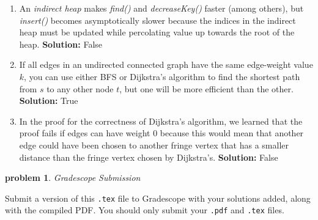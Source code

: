 \documentclass[10pt]{article}
\newcommand{\solution}[1]{\color{blue}\hfill\break\noindent\textbf{Solution:} #1\color{black}}
\newtheorem{problem}{\sc\color{cit}problem}
\begin{document}
\begin{enumerate}
\renewcommand{\theenumi}{\Alph{enumi}}

\item An \emph{indirect heap} makes \emph{find()} and \emph{decreaseKey()} faster (among others), but \emph{insert()\/} becomes asymptotically slower because the indices in the indirect heap must be updated while percolating value up towards the root of the heap.
\solution{
    False
}

\item If all edges in an undirected connected graph have the same edge-weight value $k$, you can use either BFS or Dijkstra's algorithm to find the shortest path from $s$ to any other node $t$, but one will be more efficient than the other.
\solution{
    True
}

\item In the proof for the correctness of Dijkstra's algorithm, we learned that the proof fails if edges can have weight $0$ because this would mean that another edge could have been chosen to another fringe vertex that has a smaller distance than the fringe vertex chosen by Dijkstra's.
\solution{
    False
}

\end{enumerate}

  

\begin{problem} Gradescope Submission \end{problem}
Submit a version of this \verb|.tex| file to Gradescope with your solutions added, along with the compiled PDF.  You should only submit your \verb|.pdf| and \verb|.tex| files.
\end{document}
